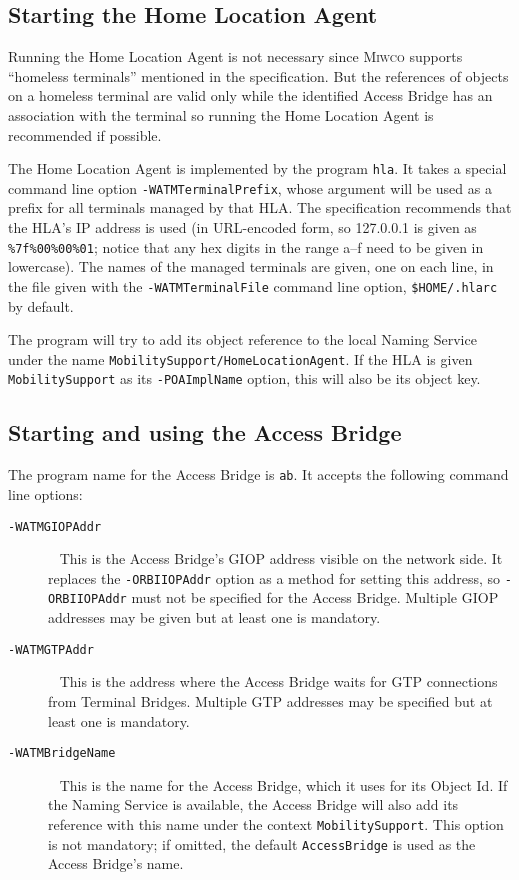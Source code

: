 \documentclass[12pt,a4paper,draft]{article}
\newcommand{\MIWCO}{\textsc{Miwco}}
\begin{document}
\subsection{Starting the Home Location Agent}

Running the Home Location Agent is not necessary since \MIWCO{}
supports ``homeless terminals'' mentioned in the specification.  But
the references of objects on a homeless terminal are valid only while
the identified Access Bridge has an association with the terminal so
running the Home Location Agent is recommended if possible.

The Home Location Agent is implemented by the program \texttt{hla}.
It takes a special command line option \texttt{-WATMTerminalPrefix},
whose argument will be used as a prefix for all terminals managed by
that HLA.  The specification recommends that the HLA's IP address is
used (in URL-encoded form, so 127.0.0.1 is given as
\texttt{\%7f\%00\%00\%01}; notice that any hex digits in the range
a--f need to be given in lowercase).  The names of the managed
terminals are given, one on each line, in the file given with the
\texttt{-WATMTerminalFile} command line option, \texttt{\$HOME/.hlarc}
by default.

The program will try to add its object reference to the local Naming
Service under the name \texttt{MobilitySupport/HomeLocationAgent}.  If
the HLA is given \texttt{MobilitySupport} as its \texttt{-POAImplName}
option, this will also be its object key.

\subsection{Starting and using the Access Bridge}

The program name for the Access Bridge is \texttt{ab}.  It accepts
the following command line options:

\begin{description}
\item[\texttt{-WATMGIOPAddr}] 
  ~\newline
  This is the Access Bridge's GIOP address visible on the network
  side.  It replaces the \texttt{-ORBIIOPAddr} option as a method for
  setting this address, so \texttt{-ORBIIOPAddr} must not be specified
  for the Access Bridge.  Multiple GIOP addresses may be given but at
  least one is mandatory.
\item[\texttt{-WATMGTPAddr}] 
  ~\newline
  This is the address where the Access Bridge waits for GTP
  connections from Terminal Bridges.  Multiple GTP addresses may be
  specified but at least one is mandatory.
\item[\texttt{-WATMBridgeName}]
  ~\newline
  This is the name for the Access Bridge, which it uses for its Object
  Id.  If the Naming Service is available, the Access Bridge will also
  add its reference with this name under the context
  \texttt{MobilitySupport}.  This option is not mandatory; if omitted,
  the default \texttt{AccessBridge} is used as the Access Bridge's
  name.
\end{description}
\end{document}
